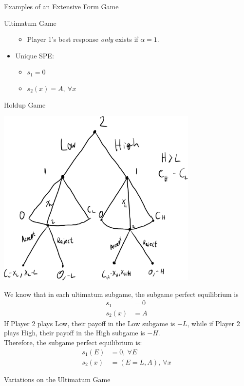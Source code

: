 \documentclass[10pt]{extarticle}
\begin{document}
\begin{problem}{Examples of an Extensive Form Game}
\begin{problem}{Ultimatum Game}
\begin{itemize}
\begin{itemize}
            \item Player 1's best response \textit{only} exists if $\alpha = 1$.
          \end{itemize}
        \item Unique SPE:
          \begin{itemize}
            \item $s_1 = 0$
            \item $s_2(x) = A,~\forall x$
          \end{itemize}
      \end{itemize}
    \end{problem}
    \begin{problem}{Holdup Game}
      \begin{center}
        \includegraphics[width=10cm]{images/holdup.png}
      \end{center}
      \tcblower
      We know that in each ultimatum subgame, the subgame perfect equilibrium is
      \begin{align*}
        s_1 &= 0\\
        s_2(x) &= A
      \end{align*}
      If Player 2 plays Low, their payoff in the Low subgame is $-L$, while if Player 2 plays High, their payoff in the High subgame is $-H$.\\

      Therefore, the subgame perfect equilibrium is:
      \begin{align*}
        s_1(E) &= 0,~\forall E\\
        s_2(x) &= (E=L,A),~\forall x
      \end{align*}
    \end{problem}
  \end{problem}
  \begin{problem}{Variations on the Ultimatum Game}
    \begin{tcbraster}[raster columns = 1,colframe = black!75!white,colback=white]
    \end{tcbraster}
  \end{problem}
\end{document}
